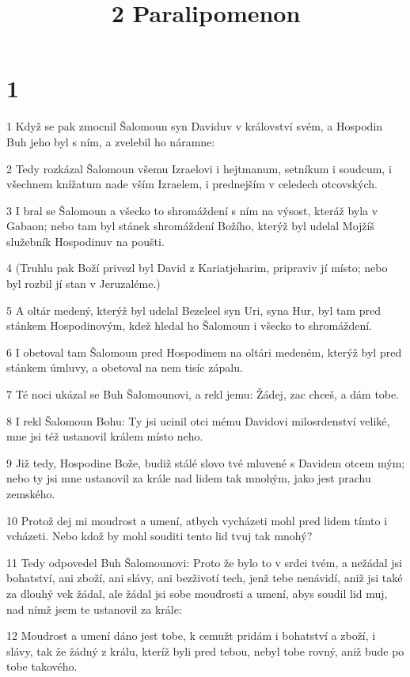 

\title{2 Paralipomenon}

\chapter{1}

\par 1 Když se pak zmocnil Šalomoun syn Daviduv v království svém, a Hospodin Buh jeho byl s ním, a zvelebil ho náramne:
\par 2 Tedy rozkázal Šalomoun všemu Izraelovi i hejtmanum, setníkum i soudcum, i všechnem knížatum nade vším Izraelem, i prednejším v celedech otcovských.
\par 3 I bral se Šalomoun a všecko to shromáždení s ním na výsost, kteráž byla v Gabaon; nebo tam byl stánek shromáždení Božího, kterýž byl udelal Mojžíš služebník Hospodinuv na poušti.
\par 4 (Truhlu pak Boží privezl byl David z Kariatjeharim, pripraviv jí místo; nebo byl rozbil jí stan v Jeruzaléme.)
\par 5 A oltár medený, kterýž byl udelal Bezeleel syn Uri, syna Hur, byl tam pred stánkem Hospodinovým, kdež hledal ho Šalomoun i všecko to shromáždení.
\par 6 I obetoval tam Šalomoun pred Hospodinem na oltári medeném, kterýž byl pred stánkem úmluvy, a obetoval na nem tisíc zápalu.
\par 7 Té noci ukázal se Buh Šalomounovi, a rekl jemu: Žádej, zac chceš, a dám tobe.
\par 8 I rekl Šalomoun Bohu: Ty jsi ucinil otci mému Davidovi milosrdenství veliké, mne jsi též ustanovil králem místo neho.
\par 9 Již tedy, Hospodine Bože, budiž stálé slovo tvé mluvené s Davidem otcem mým; nebo ty jsi mne ustanovil za krále nad lidem tak mnohým, jako jest prachu zemského.
\par 10 Protož dej mi moudrost a umení, atbych vycházeti mohl pred lidem tímto i vcházeti. Nebo kdož by mohl souditi tento lid tvuj tak mnohý?
\par 11 Tedy odpovedel Buh Šalomounovi: Proto že bylo to v srdci tvém, a nežádal jsi bohatství, ani zboží, ani slávy, ani bezživotí tech, jenž tebe nenávidí, aniž jsi také za dlouhý vek žádal, ale žádal jsi sobe moudrosti a umení, abys soudil lid muj, nad nímž jsem te ustanovil za krále:
\par 12 Moudrost a umení dáno jest tobe, k cemužt pridám i bohatství a zboží, i slávy, tak že žádný z králu, kteríž byli pred tebou, nebyl tobe rovný, aniž bude po tobe takového.
